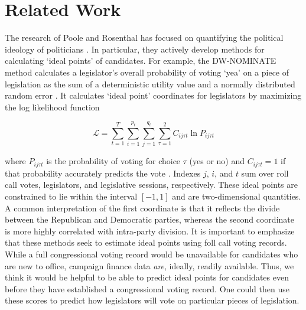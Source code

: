 \documentclass[10]{article}
\begin{document}
\section*{Related Work}

\noindent The research of Poole and Rosenthal has focused on quantifying the political ideology of politicians \cite{PR}. In particular, they actively develop methods for calculating `ideal points' of candidates. For example, the DW-NOMINATE method calculates a legislator’s overall probability of voting `yea' on a piece of legislation as the sum of a deterministic utility value and a normally distributed random error \cite{NOMBOOT}. It calculates `ideal point' coordinates for legislators by maximizing the log likelihood function

\[ \mathcal{L} = \sum_{t=1}^{T} \sum_{i=1}^{p_t} \sum_{j=1}^{q_t} \sum_{\tau = 1}^{2} C_{ij \tau t} \ln P_{ij \tau t} \]

\noindent where $P_{ij \tau t}$ is the probability of voting for choice $\tau$ (yes or no) and $C_{ij \tau t} = 1$ if that probability accurately predicts the vote \cite{NOMBOOT}. Indexes $j$, $i$, and $t$ sum over roll call votes, legislators, and legislative sessions, respectively. These ideal points are constrained to lie within the interval $\left[ -1,1 \right]$ and are two-dimensional quantities. A common interpretation of the first coordinate is that it reflects the divide between the Republican and Democratic parties, whereas the second coordinate is more highly correlated with intra-party division. It is important to emphasize that these methods seek to estimate ideal points using foll call voting records. While a full congressional voting record would be unavailable for candidates who are new to office, campaign finance data \textit{are}, ideally, readily available. Thus, we think it would be helpful to be able to predict ideal points for candidates even before they have established a congressional voting record. One could then use these scores to predict how legislators will vote on particular pieces of legislation.\\
\end{document}
